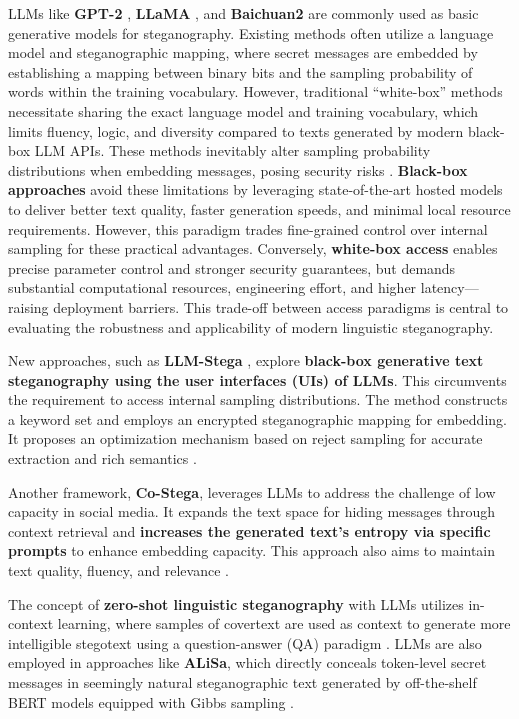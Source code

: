 LLMs like \textbf{GPT-2} \cite{radford2019language}, \textbf{LLaMA} \cite{xi2025rise}, and \textbf{Baichuan2} \cite{yang2023baichuan2} are commonly used as basic generative models for steganography.
Existing methods often utilize a language model and steganographic mapping, where secret messages are embedded by establishing a mapping between binary bits and the sampling probability of words within the training vocabulary.
However, traditional ``white-box'' methods necessitate sharing the exact language model and training vocabulary, which limits fluency, logic, and diversity compared to texts generated by modern black-box LLM APIs. These methods inevitably alter sampling probability distributions when embedding messages, posing security risks \cite{wu2024generative}. \textbf{Black-box approaches} avoid these limitations by leveraging state-of-the-art hosted models to deliver better text quality, faster generation speeds, and minimal local resource requirements. However, this paradigm trades fine-grained control over internal sampling for these practical advantages. Conversely, \textbf{white-box access} enables precise parameter control and stronger security guarantees, but demands substantial computational resources, engineering effort, and higher latency---raising deployment barriers. This trade-off between access paradigms is central to evaluating the robustness and applicability of modern linguistic steganography.

New approaches, such as \textbf{LLM-Stega} \cite{wu2024generative}, explore \textbf{black-box generative text steganography using the user interfaces (UIs) of LLMs}. This circumvents the requirement to access internal sampling distributions. The method constructs a keyword set and employs an encrypted steganographic mapping for embedding. It proposes an optimization mechanism based on reject sampling for accurate extraction and rich semantics \cite{wu2024generative}.

Another framework, \textbf{Co-Stega}, leverages LLMs to address the challenge of low capacity in social media. It expands the text space for hiding messages through context retrieval and \textbf{increases the generated text's entropy via specific prompts} to enhance embedding capacity. This approach also aims to maintain text quality, fluency, and relevance \cite{liao2024co}.

The concept of \textbf{zero-shot linguistic steganography} with LLMs utilizes in-context learning, where samples of covertext are used as context to generate more intelligible stegotext using a question-answer (QA) paradigm \cite{lin2024zero}.
LLMs are also employed in approaches like \textbf{ALiSa}, which directly conceals token-level secret messages in seemingly natural steganographic text generated by off-the-shelf BERT \cite{devlin2019bert} models equipped with Gibbs sampling \cite{yi2022alisa}.

